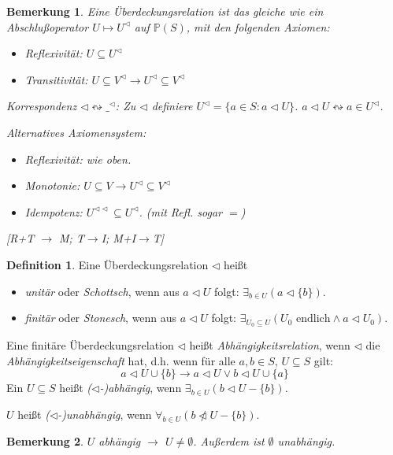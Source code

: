 \documentclass[headsepline=true,DIV=11]{scrartcl}
\newtheorem*{remark}{Bemerkung}
\theoremstyle{definition}
\newtheorem*{definition}{Definition}
\newcommand{\nlhd}{\ntriangleleft} %
\begin{document}
\begin{remark}
	Eine Überdeckungsrelation ist das gleiche wie ein {\em Abschlußoperator} $U\mapsto U^{\lhd}$ auf $\mathbb P(S)$, mit den folgenden Axiomen:
	\begin{itemize}
		\item {\em Reflexivität}: $U\subseteq U^\lhd$
		\item {\em Transitivität}: $U\subseteq V^\lhd \to U^\lhd \subseteq V^\lhd$ %
	\end{itemize}
	Korrespondenz $\lhd \leftrightsquigarrow \_^{\lhd}$:
	Zu $\lhd$ definiere $U^\lhd= \{a\in S: a\lhd U\}$.
	$a\lhd U \leftrightsquigarrow a\in U^\lhd$.

	Alternatives Axiomensystem:
	\begin{itemize}
		\item Reflexivität: wie oben.
		\item Monotonie: $U\subseteq V \to U^\lhd \subseteq V^\lhd$
		\item Idempotenz: $U^{\lhd\lhd} \subseteq U^{\lhd}$. (mit Refl. sogar $=$)
	\end{itemize}
	[R+T $\to$ M; T$\to$I; M+I$\to$T]
\end{remark}

\begin{definition}
	Eine Überdeckungsrelation $\lhd$ heißt
	\begin{itemize}
		\item {\em unitär} oder {\em Schottsch}, wenn aus $a\lhd U$ folgt: $\exists_{b\in U}(a\lhd\{b\})$.
		\item {\em finitär} oder {\em Stonesch}, wenn aus $a\lhd U$ folgt: $\exists_{U_0\subseteq U} (U_0 \text{ endlich} \land a\lhd U_0)$.
	\end{itemize}
	Eine finitäre Überdeckungsrelation $\lhd$ heißt {\em Abhängigkeitsrelation}, wenn $\lhd$ die {\em Abhängigkeitseigenschaft} hat, d.h.
	wenn für alle $a,b\in S$, $U\subseteq S$ gilt: 
	\[ a\lhd U\cup\{b\}\to a\lhd U\lor b\lhd U\cup\{a\}\]
	Ein $U\subseteq S$ heißt {\em ($\lhd$-)abhängig}, wenn $\exists_{b\in U}(b\lhd U-\{b\})$.
	
	$U$ heißt {\em ($\lhd$-)unabhängig}, wenn  $\forall_{b\in U}(b\nlhd U-\{b\})$.
\end{definition}

\begin{remark}
	$U$ abhängig $\to$ $U\neq\emptyset$. Außerdem ist $\emptyset$ unabhängig.
\end{remark}
\end{document}

